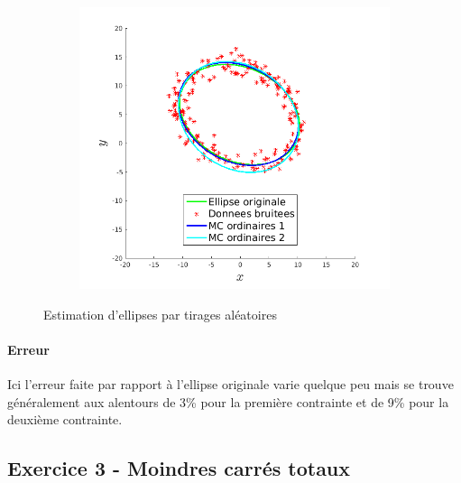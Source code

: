 \documentclass{article}
\begin{document}
\begin{figure}[!ht]
\begin{subfigure}[c]{0.49\linewidth}
        \includegraphics[width=\linewidth]{images/4-mco_2.png}
    \end{subfigure}
    \caption{Estimation d'ellipses par tirages aléatoires}
    \label{3-moindres-carres-ordinaires}
\end{figure}

\paragraph{Erreur}
Ici l'erreur faite par rapport à l'ellipse originale varie quelque peu mais se trouve généralement aux alentours de 3\% pour la première contrainte et de 9\% pour la deuxième contrainte.

\subsection{Exercice 3 - Moindres carrés totaux}
\end{document}
